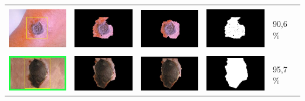 \begin{table}[H]
\begin{tabular}{|m{1.1in}|m{1.1in}|m{1.1in}|m{1.1in}|m{0.7in}|}
		&  &  & \\
		\includegraphics[width=1.1in]{gambar/hasil_segmentasi/luka_hitam/image_14_rect.jpg} \fontsize{8}{12}{(98, 43, 116, 121)}&
		\includegraphics[width=1.1in]{gambar/hasil_segmentasi/luka_hitam/result_14.jpg}&
		\includegraphics[width=1.1in]{gambar/hasil_segmentasi/luka_hitam/result_14_cv.jpg}&
		\includegraphics[width=1.1in]{gambar/hasil_segmentasi/luka_hitam/mask_14.jpg}&
		90,6 \% \\
		\hline
		
		&  &  & \\
		\includegraphics[width=1.1in]{gambar/hasil_segmentasi/luka_hitam/image_15_rect.jpg} \fontsize{8}{12}{(89, 10, 140, 171)}&
		\includegraphics[width=1.1in]{gambar/hasil_segmentasi/luka_hitam/result_15.jpg}&
		\includegraphics[width=1.1in]{gambar/hasil_segmentasi/luka_hitam/result_15_cv.jpg}&
		\includegraphics[width=1.1in]{gambar/hasil_segmentasi/luka_hitam/mask_15.jpg}&
		95,7 \% \\
		\hline
		

\end{tabular}
\end{table}
